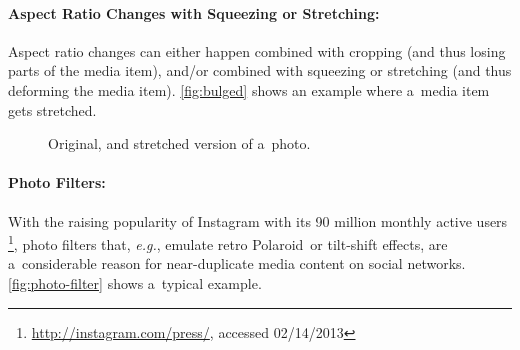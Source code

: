\paragraph{Aspect Ratio Changes with Squeezing or Stretching:}

Aspect ratio changes can either happen combined with cropping
(and thus losing parts of the media item), and/or combined with 
squeezing or stretching (and thus deforming the media item).
\autoref{fig:bulged} shows an example where a~media item gets stretched.

\begin{figure}[!ht]
  \centering
  \caption{Original, and stretched version of a~photo.}
  \label{fig:bulged}  
\end{figure}

\paragraph{Photo Filters:}

With the raising popularity of Instagram with its 90 million monthly active users%
\footnote{\url{http://instagram.com/press/}, accessed 02/14/2013},
photo filters that, \emph{e.g.}, emulate retro Polaroid\texttrademark\ or tilt-shift effects,
are a~considerable reason for near-duplicate media content on social networks.
\autoref{fig:photo-filter} shows a~typical example.

